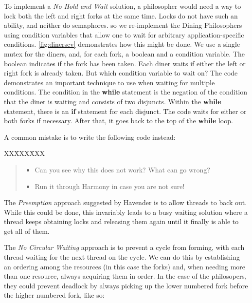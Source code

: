 \documentclass{report}
\newcommand{\harmonysource}[1]{
\begin{tabbing}
XX\=XXX\=XXX\kill
    
\end{tabbing}
}
\newenvironment{code}{
\tcolorbox
}{
\endtcolorbox
}
\begin{document}
To implement a \emph{No Hold and Wait} solution, a philosopher would need a
way to lock both the left and right forks at the same time.  Locks do not
have such an ability, and neither do semaphores. so we re-implement the
Dining Philosophers using condition variables that allow one to wait for
arbitrary application-specific conditions.
%
\autoref{fig:dinerscv} demonstrates how this might be done.
We use a single mutex for the diners, and, for each fork, a boolean
and a condition variable.  The boolean indicates if the fork has been
taken.
Each diner waits if either the left or right fork is already taken.
But which condition variable to wait on?
The code demonstrates an important technique to use when waiting for
multiple conditions.
%
The condition in the \textbf{while} statement is the negation of the
condition that the diner is waiting and consists of two disjuncts.
Within the \textbf{while} statement,
there is an \textbf{if} statement for each disjunct.
The code waits for either or both forks if necessary.  After that, it goes
back to the top of the \textbf{while} loop.

A common mistake is to write the following code instead:

\begin{code}
\harmonysource{baddblwait}
\end{code}

\begin{quote}
\begin{itemize}
\item Can you see why this does not work?  What can go wrong?
\item Run it through Harmony in case you are not sure!
\end{itemize}
\end{quote}

The \emph{Preemption} approach suggested by Havender is to allow threads to back out.
While this could be done, this invariably leads to a busy waiting solution
where a thread keeps obtaining locks and releasing them again until it
finally is able to get all of them.

The \emph{No Circular Waiting} approach
is to prevent a cycle from forming, with each
thread waiting for the next thread on the cycle.
We can do this by establishing an ordering among the
resources (in this case the forks) and, when needing more than one
resource, always acquiring them in order.  In the case of the philosopers,
they could prevent deadlock by always picking up the lower numbered fork
before the higher numbered fork, like so:
\end{document}
